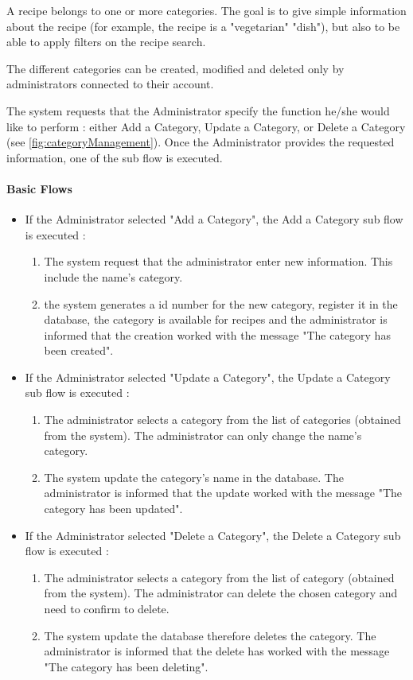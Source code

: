 {
  A recipe belongs to one or more categories. The goal is to give simple information about the recipe (for example, the recipe is a "vegetarian" "dish"), but also to be able to apply filters on the recipe search.
  
  The different categories can be created, modified and deleted only by administrators connected to their account.

}
{
  The system requests that the Administrator specify the function he/she would like to perform : either Add a Category, Update a Category, or Delete a Category (see \autoref{fig:categoryManagement}). Once the Administrator provides the requested information, one of the sub flow is executed.

  \paragraph{Basic Flows}
    \begin{itemize}
      \item If the Administrator selected "Add a Category", the Add a Category sub flow is executed :
      \begin{enumerate}
        \item The system request that the administrator enter new information. This include the name’s category.
        \item the system generates a id number for the new category, register it in the database, the category is available for recipes and the administrator is informed that the creation worked with the message "The category has been created".
      \end{enumerate}
      \item If the Administrator selected "Update a Category", the Update a Category sub flow is executed :
      \begin{enumerate}
        \item The administrator selects a category from the list of categories (obtained from the system). The administrator can only change the name’s category.
        \item The system update the category’s name in the database. The administrator is informed that the update worked with the message "The category has been updated".
      \end{enumerate}
      \item If the Administrator selected "Delete a Category", the Delete a Category sub flow is executed :
      \begin{enumerate}
        \item The administrator selects a category from the list of category (obtained from the system). The administrator can delete the chosen category and need to confirm to delete. 
        \item The system update the database therefore deletes the category. The administrator is informed that the delete has worked with the message "The category has been deleting".
      \end{enumerate}
    \end{itemize}

}
